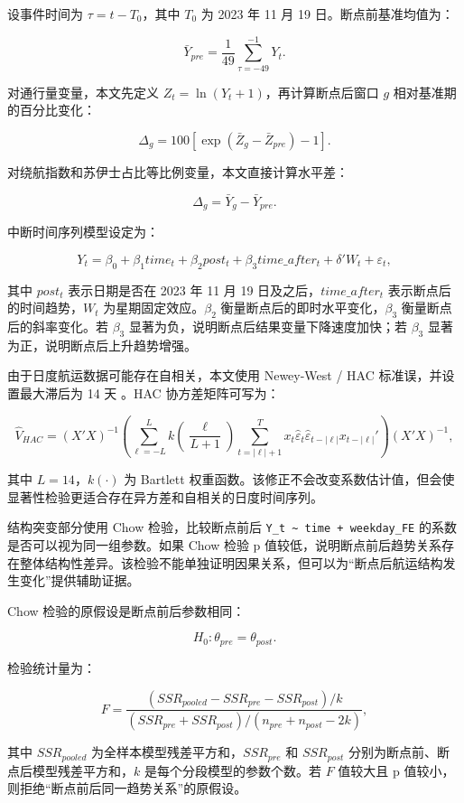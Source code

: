 \documentclass[
]{ctexart}
\begin{document}
设事件时间为 \(\tau=t-T_0\)，其中 \(T_0\) 为 2023 年 11 月 19
日。断点前基准均值为：

\[
\bar{Y}_{pre}=\frac{1}{49}\sum_{\tau=-49}^{-1}Y_t.
\]

对通行量变量，本文先定义 \(Z_t=\ln(Y_t+1)\)，再计算断点后窗口 \(g\)
相对基准期的百分比变化：

\[
\Delta_g=100\left[\exp\left(\bar{Z}_g-\bar{Z}_{pre}\right)-1\right].
\]

对绕航指数和苏伊士占比等比例变量，本文直接计算水平差：

\[
\Delta_g=\bar{Y}_g-\bar{Y}_{pre}.
\]

中断时间序列模型设定为：

\[
Y_t=\beta_0+\beta_1 time_t+\beta_2 post_t+\beta_3 time\_after_t
+\delta'W_t+\varepsilon_t,
\]

其中 \(post_t\) 表示日期是否在 2023 年 11 月 19
日及之后，\(time\_after_t\) 表示断点后的时间趋势，\(W_t\)
为星期固定效应。\(\beta_2\) 衡量断点后的即时水平变化，\(\beta_3\)
衡量断点后的斜率变化。若 \(\beta_3\)
显著为负，说明断点后结果变量下降速度加快；若 \(\beta_3\)
显著为正，说明断点后上升趋势增强。

由于日度航运数据可能存在自相关，本文使用 Newey-West / HAC
标准误，并设置最大滞后为 14 天 \citep{newey1987simple}。HAC 协方差矩阵可写为：

\[
\widehat{V}_{HAC}=(X'X)^{-1}
\left(\sum_{\ell=-L}^{L} k\left(\frac{\ell}{L+1}\right)
\sum_{t=|\ell|+1}^{T} x_t\hat{\varepsilon}_t
\hat{\varepsilon}_{t-|\ell|}x_{t-|\ell|}'\right)
(X'X)^{-1},
\]

其中 \(L=14\)，\(k(\cdot)\) 为 Bartlett
权重函数。该修正不会改变系数估计值，但会使显著性检验更适合存在异方差和自相关的日度时间序列。

结构突变部分使用 Chow 检验，比较断点前后
\texttt{Y\_t\ \textasciitilde{}\ time\ +\ weekday\_FE}
的系数是否可以视为同一组参数。如果 Chow 检验 p
值较低，说明断点前后趋势关系存在整体结构性差异。该检验不能单独证明因果关系，但可以为``断点后航运结构发生变化''提供辅助证据。

Chow 检验的原假设是断点前后参数相同：

\[
H_0:\theta_{pre}=\theta_{post}.
\]

检验统计量为：

\[
F=
\frac{(SSR_{pooled}-SSR_{pre}-SSR_{post})/k}
{(SSR_{pre}+SSR_{post})/(n_{pre}+n_{post}-2k)},
\]

其中 \(SSR_{pooled}\) 为全样本模型残差平方和，\(SSR_{pre}\) 和
\(SSR_{post}\) 分别为断点前、断点后模型残差平方和，\(k\)
是每个分段模型的参数个数。若 \(F\) 值较大且 p
值较小，则拒绝``断点前后同一趋势关系''的原假设。
\end{document}
